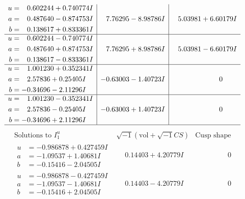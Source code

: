 \documentclass[1p]{elsarticle_modified}
\theoremstyle{definition}
\newcommand{\I}{\sqrt{-1}}
\begin{document}
$$\begin{array}{c|c|c}
\begin{aligned}
u &= \phantom{-}0.602244 + 0.740774 I \\
a &= \phantom{-}0.487640 - 0.874753 I \\
b &= \phantom{-}0.138617 + 0.833361 I\end{aligned}
 & \phantom{-}7.76295 - 8.98786 I & \phantom{-}5.03981 + 6.60179 I \\ \hline\begin{aligned}
u &= \phantom{-}0.602244 - 0.740774 I \\
a &= \phantom{-}0.487640 + 0.874753 I \\
b &= \phantom{-}0.138617 - 0.833361 I\end{aligned}
 & \phantom{-}7.76295 + 8.98786 I & \phantom{-}5.03981 - 6.60179 I \\ \hline\begin{aligned}
u &= \phantom{-}1.001230 + 0.352341 I \\
a &= \phantom{-}2.57836 + 0.25405 I \\
b &= -0.34696 - 2.11296 I\end{aligned}
 & -0.63003 - 1.40723 I & \phantom{-0.000000 } 0 \\ \hline\begin{aligned}
u &= \phantom{-}1.001230 - 0.352341 I \\
a &= \phantom{-}2.57836 - 0.25405 I \\
b &= -0.34696 + 2.11296 I\end{aligned}
 & -0.63003 + 1.40723 I & \phantom{-0.000000 } 0\\
 \hline 
 \end{array}$$\newpage$$\begin{array}{c|c|c}  
\text{Solutions to }I^u_{1}& \I (\text{vol} + \sqrt{-1}CS) & \text{Cusp shape}\\
 \hline 
\begin{aligned}
u &= -0.986878 + 0.427459 I \\
a &= -1.09537 + 1.40681 I \\
b &= -0.15416 - 2.04505 I\end{aligned}
 & \phantom{-}0.14403 + 4.20779 I & \phantom{-0.000000 } 0 \\ \hline\begin{aligned}
u &= -0.986878 - 0.427459 I \\
a &= -1.09537 - 1.40681 I \\
b &= -0.15416 + 2.04505 I\end{aligned}
 & \phantom{-}0.14403 - 4.20779 I & \phantom{-0.000000 } 0 \\ \hline\begin{aligned}

\end{aligned}
\end{array}$$
\end{document}
